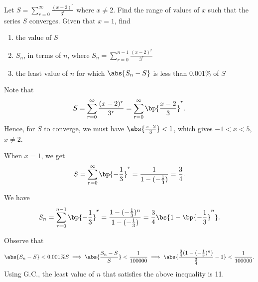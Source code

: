 \begin{problem}
    Let $S = \sum_{r=0}^\infty \frac{(x-2)^r}{3^r}$ where $x \neq 2$. Find the range of values of $x$ such that the series $S$ converges. Given that $x=1$, find

    \begin{enumerate}
        \item the value of $S$
        \item $S_n$, in terms of $n$, where $S_n = \sum_{r=0}^{n-1} \frac{(x-2)^r}{3^r}$
        \item the least value of $n$ for which $\abs{S_n - S}$ is less than 0.001\% of $S$
    \end{enumerate}
\end{problem}
\begin{solution}
    Note that \[S = \sum_{r=0}^\infty \frac{(x-2)^r}{3^r} = \sum_{r=0}^\infty \bp{\frac{x-2}3 }^r.\] Hence, for $S$ to converge, we must have $\abs{\frac{x-2}{3}} < 1$, which gives $-1 < x < 5$, $x \neq 2$.

    \begin{ppart}
        When $x = 1$, we get \[S = \sum_{r=0}^\infty \bp{-\frac13 }^r = \frac1{1-(-\frac13)} = \frac34.\]
    \end{ppart}
    \begin{ppart}
        We have
        \[S_n = \sum_{r=0}^{n-1} \bp{-\frac13 }^r = \frac{1 - (-\frac13)^n}{1 - (-\frac13)} = \frac34 \bs{1 - \bp{-\frac13}^n}.\]
    \end{ppart}
    \begin{ppart}
        Observe that \[\abs{S_n - S} < 0.001\% S \implies \abs{\frac{S_n - S}S} < \frac{1}{100000} \implies \abs{\frac{\frac34(1 - (-\frac13)^n)}{\frac34} - 1} < \frac1{100000}.\] Using G.C., the least value of $n$ that satisfies the above inequality is 11.
    \end{ppart}
\end{solution}

